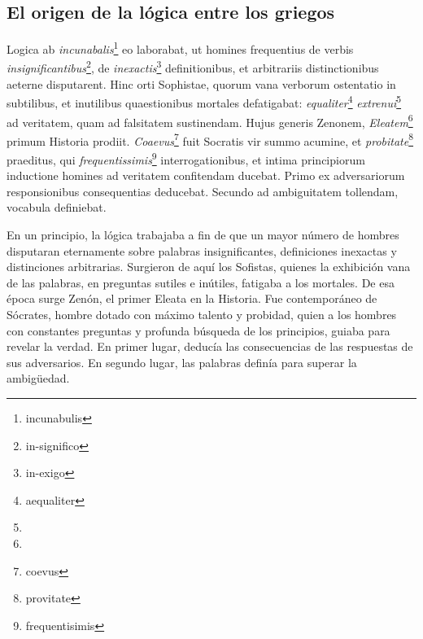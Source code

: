 \documentclass{article}
\begin{document}
\begin{paracol}{2}
\begin{nthcolumn}{1}
    \subsection*{\centering El origen de la lógica entre los griegos} 
  \end{nthcolumn}
\vspace{0.5cm}
\begin{nthcolumn*}{0} %
  Logica ab \emph{incunabalis}\footnote{incunabulis} eo laborabat, ut homines frequentius de verbis \emph{insignificantibus}\footnote{in-significo}, de \emph{inexactis}\footnote{in-exigo} definitionibus, et arbitrariis distinctionibus aeterne disputarent. Hinc orti Sophistae, quorum vana verborum ostentatio in subtilibus, et inutilibus quaestionibus mortales defatigabat: \emph{equaliter}\footnote{aequaliter} \emph{extrenui}\footnote{ } ad veritatem, quam ad falsitatem sustinendam. Hujus generis Zenonem, \emph{Eleatem}\footnote{ } primum Historia prodiit. \emph{Coaevus}\footnote{coevus} fuit Socratis vir summo acumine, et \emph{probitate}\footnote{provitate} praeditus, qui \emph{frequentissimis}\footnote{frequentisimis} interrogationibus, et intima principiorum inductione homines ad veritatem confitendam ducebat. Primo ex adversariorum responsionibus consequentias deducebat. Secundo ad ambiguitatem tollendam, vocabula definiebat.
\end{nthcolumn*}
\vspace{0.5cm}
\begin{nthcolumn}{1} %
  En un principio, la lógica trabajaba a fin de que un mayor número de hombres disputaran eternamente sobre palabras insignificantes, definiciones inexactas y distinciones arbitrarias. Surgieron de aquí los Sofistas, quienes la exhibición vana de las palabras, en preguntas sutiles e inútiles, fatigaba a los mortales. De esa época surge Zenón, el primer Eleata en la Historia. Fue contemporáneo de Sócrates, hombre dotado con máximo talento y probidad, quien a los hombres con constantes preguntas y profunda búsqueda de los principios, guiaba para revelar la verdad. En primer lugar, deducía las consecuencias de las respuestas de sus adversarios. En segundo lugar, las palabras definía para superar la ambigüedad.
\end{nthcolumn}
\vspace{0.5cm}
\end{paracol}
\end{document}
